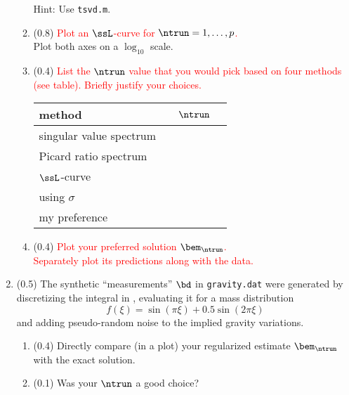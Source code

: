 \documentclass[11pt,titlepage,fleqn]{article}
\newcommand{\mv}{\xi}  %
\begin{document}
\begin{enumerate}
\begin{enumerate}
Hint: Use \verb+tsvd.m+.

\item (0.8) \textcolor{red}{Plot an $\ssL$-curve \citep[][p.~95]{AsterE2} for $\ntrun = 1,\ldots,p$.} \\
Plot both axes on a $\log_{10}$ scale.

\item (0.4) \textcolor{red}{List the $\ntrun$ value that you would pick based on four methods (see table). Briefly justify your choices.}

\begin{center}
\begin{tabular}{l|l}
\hline
method & $\;\;\;\;\ntrun\;\;\;\;$ \\ \hline\hline
singular value spectrum & \\ \hline
Picard ratio spectrum & \\ \hline
$\ssL$-curve & \\ \hline
using $\sigma$ \\ \hline
my preference \\ \hline
\end{tabular}
\end{center}

\item (0.4) \textcolor{red}{Plot your preferred solution $\bem_{\ntrun}$. \\
Separately plot its predictions along with the data.}

\end{enumerate}
\label{prob2}


\item (0.5) The synthetic ``measurements'' $\bd$ in \verb+gravity.dat+ were generated by discretizing the integral in , evaluating it for a mass distribution 
%
\begin{equation}
f(\mv) = \sin(\pi\mv) + 0.5 \sin(2\pi\mv)
\end{equation}
%
and adding pseudo-random noise to the implied gravity variations.

\begin{enumerate}
\item (0.4) Directly compare (in a plot) your regularized estimate $\bem_{\ntrun}$ with the exact solution.
\item (0.1) Was your $\ntrun$ a good choice?
\end{enumerate}

\end{enumerate}
\end{document}
